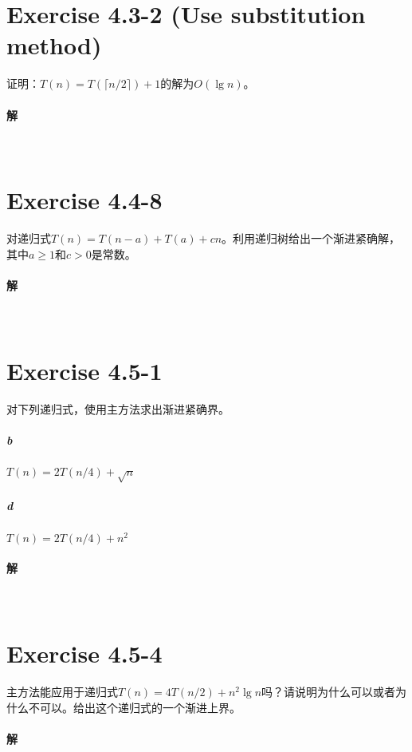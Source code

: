 \documentclass{article}
\begin{document}
\section{Exercise 4.3-2 (Use substitution method) }
证明：$T(n)=T(\lceil n/2 \rceil)+1$的解为$O(\lg{n})$。
\\

\paragraph{解}
\\

\section{Exercise 4.4-8}
对递归式$T(n)=T(n-a)+T(a)+cn$。利用递归树给出一个渐进紧确解，其中$a \geq 1$和$c>0$是常数。
\\

\paragraph{解}
\\

\section{Exercise 4.5-1}
对下列递归式，使用主方法求出渐进紧确界。
\subparagraph{b}
$T(n)=2T(n/4)+\sqrt{n}$
\subparagraph{d}
$T(n)=2T(n/4)+n^2$
\\

\paragraph{解}
\\

\section{Exercise 4.5-4}
主方法能应用于递归式$T(n)=4T(n/2)+n^2\lg{n}$吗？请说明为什么可以或者为什么不可以。给出这个递归式的一个渐进上界。
\\

\paragraph{解}
\\
\end{document}
